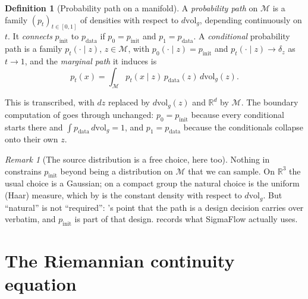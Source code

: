 \documentclass[11pt,a4paper]{report}
\theoremstyle{definition}
\newtheorem{definition}[definition]{Definition}
\theoremstyle{remark}
\newtheorem{remark}[remark]{Remark}
\newcommand{\RR}{\mathbb R}
\begin{document}
\begin{definition}[Probability path on a manifold]
\label{def:riemannian-path}
A \emph{probability path} on $\mathcal M$ is a family $(p_t)_{t\in[0,1]}$ of
densities with respect to $d\mathrm{vol}_g$, depending continuously on $t$.
It \emph{connects} $p_{\mathrm{init}}$ to $p_{\mathrm{data}}$ if
$p_0=p_{\mathrm{init}}$ and $p_1=p_{\mathrm{data}}$. A \emph{conditional}
probability path is a family $p_t(\cdot\mid z)$, $z\in\mathcal M$, with
$p_0(\cdot\mid z)=p_{\mathrm{init}}$ and $p_t(\cdot\mid z)\to\delta_z$ as
$t\to1$, and the \emph{marginal path} it induces is
\begin{equation}
\label{eq:riemannian-marginal-path}
p_t(x)=\int_{\mathcal M}p_t(x\mid z)\,p_{\mathrm{data}}(z)\,d\mathrm{vol}_g(z) .
\end{equation}
\end{definition}

This is 
transcribed, with $dz$ replaced by $d\mathrm{vol}_g(z)$ and $\RR^d$ by
$\mathcal M$. The boundary computation of  goes through
unchanged: $p_0=p_{\mathrm{init}}$ because every conditional starts there and
$\int p_{\mathrm{data}}\,d\mathrm{vol}_g=1$, and $p_1=p_{\mathrm{data}}$
because the conditionals collapse onto their own $z$.

\begin{remark}[The source distribution is a free choice, here too]
\label{rem:rfm-source-choice}
Nothing in  constrains $p_{\mathrm{init}}$ beyond
being a distribution on $\mathcal M$ that we can sample. On $\RR^3$ the
usual choice is a Gaussian; on a compact group the natural choice is the
uniform (Haar) measure, which by  is the
constant density with respect to $d\mathrm{vol}_g$. But ``natural'' is not
``required'': 's point that the path is a design
decision carries over verbatim, and $p_{\mathrm{init}}$ is part of that
design.  records what SigmaFlow actually uses.
\end{remark}

\section{The Riemannian continuity equation}
\label{sec:rfm-continuity}
\end{document}
